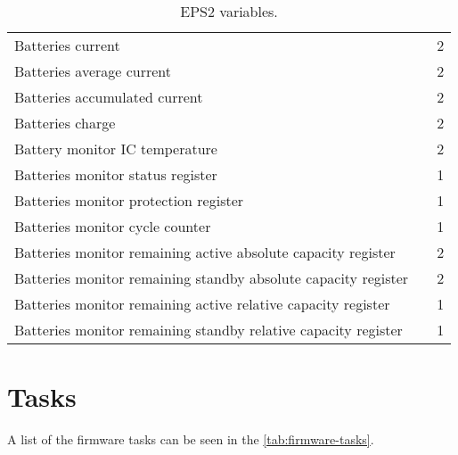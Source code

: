 \begin{table}[!h]
\begin{tabular}{lcc}
        Batteries current                       &                &  2                       \\
        Batteries average current               &                &  2                       \\
        Batteries accumulated current           &                &  2                       \\
        Batteries charge                        &                &  2                       \\
        Battery monitor IC temperature          &                &  2                       \\
        Batteries monitor status register       &                &  1                       \\
        Batteries monitor protection register   &                &  1                       \\
        Batteries monitor cycle counter         &                &  1                       \\
        Batteries monitor remaining active absolute capacity register   &                &  2                       \\
        Batteries monitor remaining standby absolute capacity register  &                &  2                       \\
        Batteries monitor remaining active relative capacity register   &                &  1                       \\
        Batteries monitor remaining standby relative capacity register  &                &  1                       \\
        \bottomrule[1.5pt]
    \end{tabular}
    \caption{EPS2 variables.}
    \label{tab:eps2-variables}
\end{table}


\section{Tasks}

A list of the firmware tasks can be seen in the \autoref{tab:firmware-tasks}.

